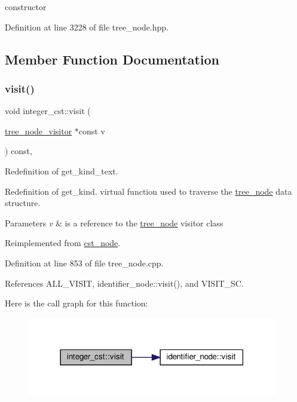 constructor 



Definition at line 3228 of file tree\+\_\+node.\+hpp.



\subsection{Member Function Documentation}
\mbox{\label{structinteger__cst_a9cf8f2538b55564a1064ed928fdd5dc1}} 
\subsubsection{\texorpdfstring{visit()}{visit()}}
{\footnotesize\ttfamily void integer\+\_\+cst\+::visit (\begin{DoxyParamCaption}\item[{\hyperlink{classtree__node__visitor}{tree\+\_\+node\+\_\+visitor} $\ast$const}]{v }\end{DoxyParamCaption}) const\hspace{0.3cm}{\ttfamily [override]}, {\ttfamily [virtual]}}



Redefinition of get\+\_\+kind\+\_\+text. 

Redefinition of get\+\_\+kind. virtual function used to traverse the \hyperlink{classtree__node}{tree\+\_\+node} data structure. 
\begin{DoxyParams}{Parameters}
{\em v} & is a reference to the \hyperlink{classtree__node}{tree\+\_\+node} visitor class \\
\hline
\end{DoxyParams}


Reimplemented from \hyperlink{structcst__node_a64e2bc20ffda1b13ffe894cacb982f89}{cst\+\_\+node}.



Definition at line 853 of file tree\+\_\+node.\+cpp.



References A\+L\+L\+\_\+\+V\+I\+S\+IT, identifier\+\_\+node\+::visit(), and V\+I\+S\+I\+T\+\_\+\+SC.

Here is the call graph for this function\+:
\nopagebreak
\begin{figure}[H]
\begin{center}
\leavevmode
\includegraphics[width=309pt]{dd/d09/structinteger__cst_a9cf8f2538b55564a1064ed928fdd5dc1_cgraph}
\end{center}
\end{figure}


